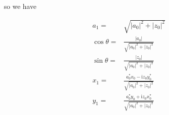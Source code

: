 \documentclass[10pt,fleqn]{article}
\newcommand{\ui}{\mathrm{i}}
\newcommand{\eqar}[1]
{
  \begin{align*}
    #1
  \end{align*}
}
\newcommand{\abs}[1]{{\left|{#1}\right|}}
\begin{document}
so we have
\eqar{
  a_1=&\sqrt{\abs{a_0}^2+\abs{z_0}^2}\\
  \cos\theta=&\frac{\abs{a_0}}{\sqrt{\abs{a_0}^2+\abs{z_0}^2}}\\
  \sin\theta=&\frac{\abs{z_0}}{\sqrt{\abs{a_0}^2+\abs{z_0}^2}}\\
  x_1=&\frac{a_0^*x_0-\ui z_0y_0^*}{\sqrt{\abs{a_0}^2+\abs{z_0}^2}}\\
  y_1=&\frac{a_0^*y_0+\ui z_0x_0^*}{\sqrt{\abs{a_0}^2+\abs{z_0}^2}}
}
\end{document}
